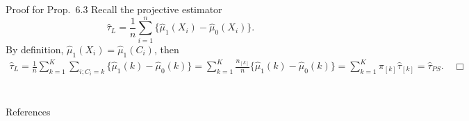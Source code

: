 \documentclass[aspectratio=169, 12pt]{beamer}
\begin{document}
\begin{frame}[label=pr-prop-6-3]{Proof for Prop.~6.3}
  Recall the projective estimator $$\widehat{\tau}_{L}=\dfrac{1}{n}\sum_{i=1}^{n}\{\widehat{\mu}_1(X_i)-\widehat{\mu}_0(X_i)\}.$$
  By definition, $\widehat{\mu}_1(X_i)=\widehat{\mu}_1(C_i)$, then
  \begin{align*}
    \widehat{\tau}_L
    =\frac{1}{n}\sum_{k=1}^{K}\sum_{i;C_i=k}^{}\{\widehat{\mu}_1(k)-\widehat{\mu}_0(k)\}
    =\sum_{k=1}^{K}\frac{n_{[k]}}{n}\{\widehat{\mu}_1(k)-\widehat{\mu}_0(k)\}
    =\sum_{k=1}^{K}\pi_{[k]}\widehat{\tau}_{[k]}=\widehat{\tau}_{PS}.\quad \Box
  \end{align*}
  \vfill
  \hfill\hyperlink{prop-6-3<1>}{}
\end{frame}

\section{}
\begin{frame}{References}
  \beamerdefaultoverlayspecification{}
  \small
  
\end{frame}
\end{document}
